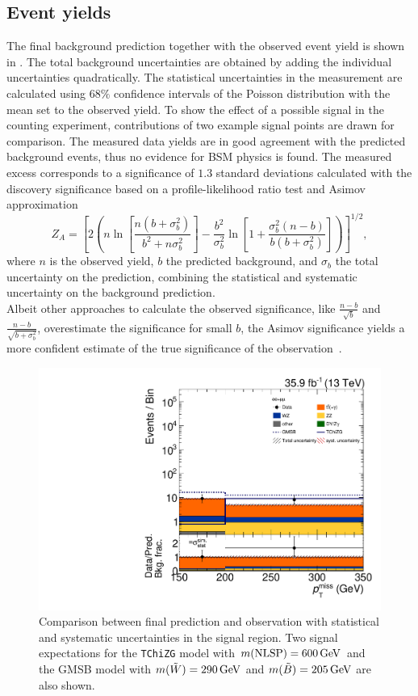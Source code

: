 \subsection*{Event yields}
The final background prediction together with the observed event yield is shown in .
The total background uncertainties are obtained by adding the individual uncertainties quadratically. The statistical uncertainties in the measurement are calculated using $68\%$ confidence intervals of the Poisson distribution with the mean set to the observed yield.
To show the effect of a possible signal in the counting experiment, contributions of two example signal points are drawn for comparison. The measured data yields are in good agreement with the predicted background events, thus no evidence for BSM physics is found. The measured excess corresponds to a significance of $1.3$ standard deviations calculated with the discovery significance based on a profile-likelihood ratio test and Asimov approximation~\cite{Significance2}
\begin{equation}
 Z_A = \left[ 2\left( n\ln{\left[\frac{n(b+\sigma_{b}^2)}{b^2+n\sigma_{b}^2}\right]} -\frac{b^2}{\sigma_{b}^2} \ln \left[1+\frac{\sigma_b ^2 (n-b)}{b(b+\sigma_b ^2)} \right]  \right)    \right]^{1/2},
\end{equation}
where $n$ is the observed yield, $b$ the predicted background, and $\sigma_{b}$ the total uncertainty on the prediction, combining the statistical and systematic uncertainty on the background prediction.\\
Albeit other approaches to calculate the observed significance, like $\frac{n-b}{\sqrt{b}}$ and $\frac{n-b}{\sqrt{b+\sigma_b^2}}$, overestimate the significance for small $b$, the Asimov significance yields a more confident estimate of the true significance of the observation~\cite{Significance}.
\begin{figure}[bpt]
 \centering
 \includegraphics[width=\pairwidth]{figures/EndorsementPlots/final_MC_log}
 \caption{Comparison between final prediction and observation with statistical and systematic uncertainties in the signal region. Two signal expectations for the \texttt{TChiZG} model with $m(\text{NLSP})=600\,\text{Ge\hspace{-.08em}V}$ and the GMSB model with $m(\tilde{W})=290\,\text{Ge\hspace{-.08em}V}$ and $m(\tilde{B})=205\,\text{Ge\hspace{-.08em}V}$ are also shown.}
 \label{fig:result}
\end{figure}
